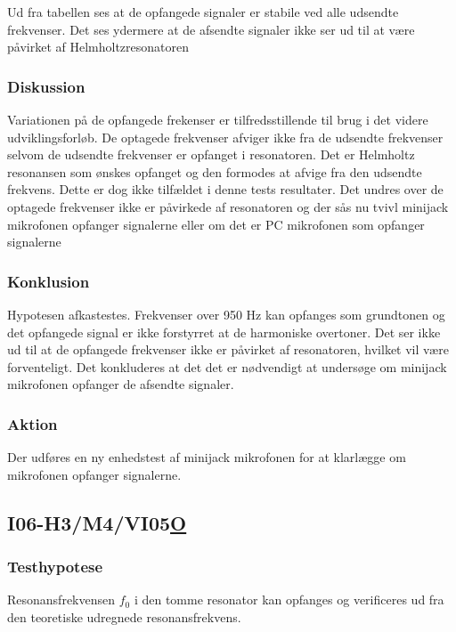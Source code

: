 			Ud fra tabellen ses at de opfangede signaler er stabile ved alle udsendte frekvenser. Det ses ydermere at de afsendte signaler ikke ser ud til at være påvirket af Helmholtzresonatoren
				
			  
			\subsubsection{Diskussion}
			 Variationen på de opfangede frekenser er tilfredsstillende til brug i det videre udviklingsforløb. De optagede frekvenser afviger ikke fra de udsendte frekvenser selvom de udsendte frekvenser er opfanget i resonatoren. Det er Helmholtz resonansen som ønskes opfanget og den formodes at afvige fra den udsendte frekvens. Dette er dog ikke tilfældet i denne tests resultater. Det undres over de optagede frekvenser ikke er påvirkede af resonatoren og der sås nu tvivl minijack mikrofonen opfanger signalerne eller om det er PC mikrofonen som opfanger signalerne
			
			\subsubsection{Konklusion}
			Hypotesen afkastestes. Frekvenser over 950 Hz kan opfanges som grundtonen og det opfangede signal er ikke forstyrret at de harmoniske overtoner. Det ser ikke ud til at de opfangede frekvenser ikke er påvirket af resonatoren, hvilket vil være forventeligt. Det konkluderes at det det er nødvendigt at undersøge om minijack mikrofonen opfanger de afsendte signaler. 
			
			\subsubsection{Aktion}
			 Der udføres en ny enhedstest af minijack mikrofonen for at klarlægge om mikrofonen opfanger signalerne. 
			 
 	\subsection{I06-H3/M4/VI05\underline{O}}
	
	\subsubsection{Testhypotese}
	Resonansfrekvensen $f_{0}$ i den tomme resonator kan opfanges og verificeres ud fra den teoretiske udregnede resonansfrekvens. 
		

